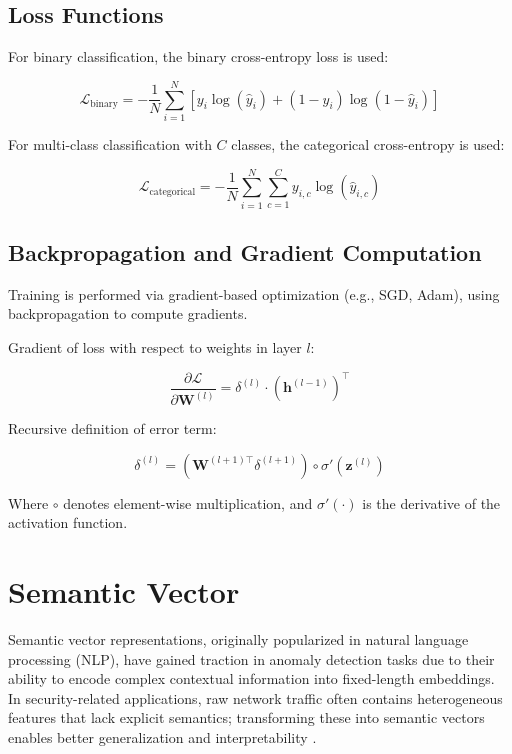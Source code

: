 \begin{ZhChapter}
    \subsection{Loss Functions}

    For binary classification, the binary cross-entropy loss is used:

    \begin{equation}
        \mathcal{L}_{\text{binary}} = - \frac{1}{N} \sum_{i=1}^{N} \left[ y_i \log(\hat{y}_i) + (1 - y_i) \log(1 - \hat{y}_i) \right]
        \label{eq:binary_loss}
    \end{equation}

    For multi-class classification with $C$ classes, the categorical cross-entropy is used:

    \begin{equation}
        \mathcal{L}_{\text{categorical}} = - \frac{1}{N} \sum_{i=1}^{N} \sum_{c=1}^{C} y_{i,c} \log(\hat{y}_{i,c})
        \label{eq:categorical_loss}
    \end{equation}

    \subsection{Backpropagation and Gradient Computation}

    Training is performed via gradient-based optimization (e.g., SGD, Adam), using backpropagation to compute gradients.

    Gradient of loss with respect to weights in layer $l$:

    \begin{equation}
        \frac{\partial \mathcal{L}}{\partial \mathbf{W}^{(l)}} = \delta^{(l)} \cdot \left( \mathbf{h}^{(l-1)} \right)^\top
        \label{eq:gradient_weight}
    \end{equation}

    Recursive definition of error term:

    \begin{equation}
        \delta^{(l)} = \left( \mathbf{W}^{(l+1)\top} \delta^{(l+1)} \right) \circ \sigma'\left( \mathbf{z}^{(l)} \right)
        \label{eq:delta_recursive}
    \end{equation}

    Where $\circ$ denotes element-wise multiplication, and $\sigma'(\cdot)$ is the derivative of the activation function.


    \section{Semantic Vector}
    Semantic vector representations, originally popularized in natural language processing (NLP), have gained traction in anomaly detection tasks due to their ability to encode complex contextual information into fixed-length embeddings. In security-related applications, raw network traffic often contains heterogeneous features that lack explicit semantics; transforming these into semantic vectors enables better generalization and interpretability \cite{mikolov2013distributed}.


\end{ZhChapter}
